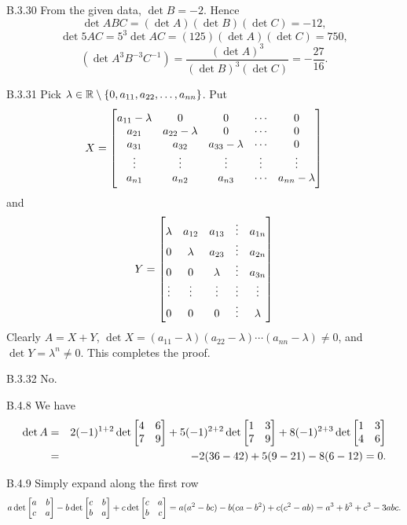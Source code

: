 \begin{Answer}{B.3.30}
 From the given data, $\det B = -2.$ Hence
 $$\det ABC = (\det A)(\det B)(\det C) = -12,$$
 $$\det 5AC = 5^3\det AC = (125)(\det A)(\det C) = 750,$$
 $$(\det A^3B^{-3}C^{-1}) = \frac{(\det A)^3}{(\det B)^3(\det C)} = -\frac{27}{16}.$$
\end{Answer}
\begin{Answer}{B.3.31}
 Pick $\lambda \in \bbR \setminus \{0,
a_{11}, a_{22}, \ldots , a_{nn}\}$. Put
$$X = \begin{bmatrix} a_{11} - \lambda & 0 & 0 & \cdots &  0 \cr a_{21}  & a_{22} - \lambda & 0 & \cdots & 0 \cr
a_{31}  & a_{32}  & a_{33} - \lambda & \cdots &  0 \cr \vdots &
\vdots & \vdots & \vdots & \vdots \cr a_{n1} & a_{n2} & a_{n3} &
\cdots & a_{nn} - \lambda
\end{bmatrix}$$and
$$Y = \begin{bmatrix}
\lambda & a_{12} & a_{13} & \vdots & a_{1n} \cr   0 & \lambda &
a_{23} & \vdots & a_{2n} \cr
 0 & 0 &
\lambda & \vdots & a_{3n} \cr \vdots & \vdots & \vdots & \vdots &
\vdots \cr
 0 & 0 &
0 & \vdots & \lambda \cr


\end{bmatrix}$$ Clearly  $A = X + Y$, $\det X = (a_{11} - \lambda)(a_{22} -
\lambda)\cdots (a_{nn} - \lambda) \neq 0$, and $\det Y = \lambda^n
\neq 0$. This completes the proof.
\end{Answer}
\begin{Answer}{B.3.32}
No.
\end{Answer}
\begin{Answer}{B.4.8}
 We have
\begin{eqnarray*}\det A  & = & 2(-1)^{1 + 2}\det
\begin{bmatrix} 4 & 6 \cr 7 & 9 \end{bmatrix} + 5(-1)^{2 + 2}\det
\begin{bmatrix} 1 & 3 \cr 7 & 9 \end{bmatrix} + 8(-1)^{2 + 3}\det
\begin{bmatrix} 1 & 3 \cr 4 & 6 \end{bmatrix} \\ &  =  & -2(36 - 42) +
5(9 - 21) - 8(6 - 12) = 0. \end{eqnarray*}
\end{Answer}
\begin{Answer}{B.4.9}
 Simply expand along the first row$$a\det\begin{bmatrix} a & b
\cr c & a
\end{bmatrix} - b\det\begin{bmatrix}
c & b \cr b & a
\end{bmatrix} + c\det\begin{bmatrix}
c & a \cr b & c\end{bmatrix} = a(a^2 -bc ) - b(ca - b^2) + c(c^2 -
ab) = a^3+b^3+c^3-3abc .
$$
\end{Answer}
